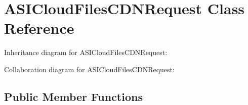 \hypertarget{interface_a_s_i_cloud_files_c_d_n_request}{
\section{\-A\-S\-I\-Cloud\-Files\-C\-D\-N\-Request \-Class \-Reference}
\label{interface_a_s_i_cloud_files_c_d_n_request}
}


\-Inheritance diagram for \-A\-S\-I\-Cloud\-Files\-C\-D\-N\-Request\-:


\-Collaboration diagram for \-A\-S\-I\-Cloud\-Files\-C\-D\-N\-Request\-:
\subsection*{\-Public \-Member \-Functions}
